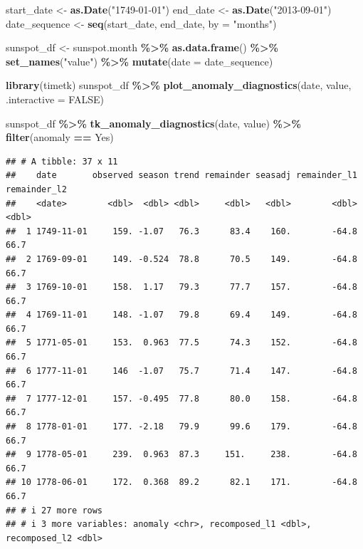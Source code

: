 \documentclass[
]{book}
\newenvironment{Shaded}{\begin{snugshade}}{\end{snugshade}}
\newcommand{\AttributeTok}[1]{\textcolor[rgb]{0.13,0.29,0.53}{#1}}
\newcommand{\ConstantTok}[1]{\textcolor[rgb]{0.56,0.35,0.01}{#1}}
\newcommand{\FunctionTok}[1]{\textcolor[rgb]{0.13,0.29,0.53}{\textbf{#1}}}
\newcommand{\NormalTok}[1]{#1}
\newcommand{\OtherTok}[1]{\textcolor[rgb]{0.56,0.35,0.01}{#1}}
\newcommand{\SpecialCharTok}[1]{\textcolor[rgb]{0.81,0.36,0.00}{\textbf{#1}}}
\newcommand{\StringTok}[1]{\textcolor[rgb]{0.31,0.60,0.02}{#1}}
\begin{document}
\begin{Shaded}
\begin{Highlighting}[]
\NormalTok{start\_date }\OtherTok{\textless{}{-}} \FunctionTok{as.Date}\NormalTok{(}\StringTok{"1749{-}01{-}01"}\NormalTok{)}
\NormalTok{end\_date }\OtherTok{\textless{}{-}} \FunctionTok{as.Date}\NormalTok{(}\StringTok{"2013{-}09{-}01"}\NormalTok{)}
\NormalTok{date\_sequence }\OtherTok{\textless{}{-}} \FunctionTok{seq}\NormalTok{(start\_date, end\_date, }\AttributeTok{by =} \StringTok{"months"}\NormalTok{)}

\NormalTok{sunspot\_df }\OtherTok{\textless{}{-}}\NormalTok{ sunspot.month }\SpecialCharTok{\%\textgreater{}\%}
  \FunctionTok{as.data.frame}\NormalTok{() }\SpecialCharTok{\%\textgreater{}\%}
  \FunctionTok{set\_names}\NormalTok{(}\StringTok{"value"}\NormalTok{) }\SpecialCharTok{\%\textgreater{}\%}
  \FunctionTok{mutate}\NormalTok{(}\AttributeTok{date =}\NormalTok{ date\_sequence)}

\FunctionTok{library}\NormalTok{(timetk)}
\NormalTok{sunspot\_df }\SpecialCharTok{\%\textgreater{}\%} 
  \FunctionTok{plot\_anomaly\_diagnostics}\NormalTok{(date, value,}
                           \AttributeTok{.interactive =} \ConstantTok{FALSE}\NormalTok{) }

\NormalTok{sunspot\_df }\SpecialCharTok{\%\textgreater{}\%} 
  \FunctionTok{tk\_anomaly\_diagnostics}\NormalTok{(date, value) }\SpecialCharTok{\%\textgreater{}\%} 
  \FunctionTok{filter}\NormalTok{(anomaly }\SpecialCharTok{==} \StringTok{\textquotesingle{}Yes\textquotesingle{}}\NormalTok{)}
\end{Highlighting}
\end{Shaded}

\begin{verbatim}
## # A tibble: 37 x 11
##    date       observed season trend remainder seasadj remainder_l1 remainder_l2
##    <date>        <dbl>  <dbl> <dbl>     <dbl>   <dbl>        <dbl>        <dbl>
##  1 1749-11-01     159. -1.07   76.3      83.4    160.        -64.8         66.7
##  2 1769-09-01     149. -0.524  78.8      70.5    149.        -64.8         66.7
##  3 1769-10-01     158.  1.17   79.3      77.7    157.        -64.8         66.7
##  4 1769-11-01     148. -1.07   79.8      69.4    149.        -64.8         66.7
##  5 1771-05-01     153.  0.963  77.5      74.3    152.        -64.8         66.7
##  6 1777-11-01     146  -1.07   75.7      71.4    147.        -64.8         66.7
##  7 1777-12-01     157. -0.495  77.8      80.0    158.        -64.8         66.7
##  8 1778-01-01     177. -2.18   79.9      99.6    179.        -64.8         66.7
##  9 1778-05-01     239.  0.963  87.3     151.     238.        -64.8         66.7
## 10 1778-06-01     172.  0.368  89.2      82.1    171.        -64.8         66.7
## # i 27 more rows
## # i 3 more variables: anomaly <chr>, recomposed_l1 <dbl>, recomposed_l2 <dbl>
\end{verbatim}
\end{document}
